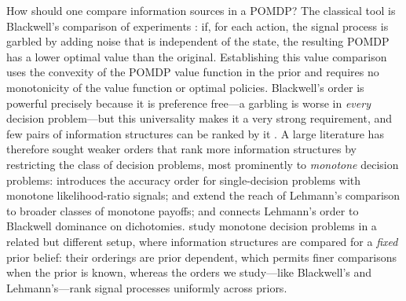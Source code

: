 How should one compare information sources in a POMDP? The classical
tool is Blackwell's comparison of experiments
\citep{blackwell1951comparison}: if, for each action, the signal
process is garbled by adding noise that is independent of the state,
the resulting POMDP has a lower optimal value than the original.
Establishing this value comparison uses the convexity of the POMDP
value function in the prior \citep{smallwood1973optimal} and requires
no monotonicity of the value function or optimal policies. Blackwell's
order is powerful precisely because it is preference free---a garbling
is worse in \emph{every} decision problem---but this universality
makes it a very strong requirement, and few pairs of information
structures can be ranked by it \citep{lehmann1988comparing,
kim2023comparing}. A large literature has therefore sought weaker
orders that rank more information structures by restricting the class
of decision problems, most prominently to \emph{monotone} decision
problems: \citet{lehmann1988comparing} introduces the accuracy order
for single-decision problems with monotone likelihood-ratio signals;
\citet{persico2000information} and \citet{quah2009comparative} extend
the reach of Lehmann's comparison to broader classes of monotone
payoffs; and \citet{jewitt2007information} connects Lehmann's order to
Blackwell dominance on dichotomies. \citet{athey2018value} study
monotone decision problems in a related but different setup, where
information structures are compared for a \emph{fixed} prior belief:
their orderings are prior dependent, which permits finer comparisons
when the prior is known, whereas the orders we study---like Blackwell's
and Lehmann's---rank signal processes uniformly across priors.

